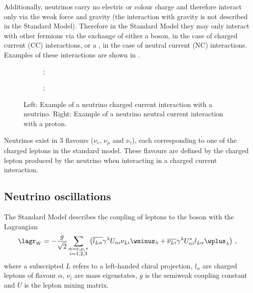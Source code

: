 Additionally, neutrinos carry no electric or colour charge and therefore interact only via the weak force and gravity (the interaction with gravity is not described in the Standard Model).
Therefore in the Standard Model they may only interact with other fermions via the exchange of either a \wpm boson, in the case of charged current (CC) interactions, or a \zboson, in the case of neutral current (NC) interactions.
Examples of these interactions are shown in .

\begin{figure}[h]
  \centering
  \begin{subfigure}[t]{.49\textwidth}
    \centering
    ;
  \end{subfigure}
  \hfill
  \begin{subfigure}[t]{.49\textwidth}
    \centering
    ;    
  \end{subfigure}
  \caption[Examples of diagrams for charged (CC) and neutral (NC) current neutrino interactions.]{Left: Example of a neutrino charged current interaction with a neutrino. Right: Example of a neutrino neutral current interaction with a proton.}
  \label{fig:nuIntEx}
\end{figure}

Neutrinos exist in 3 flavours ($\nu_{e}$, $\nu_{\mu}$ and $\nu_{\tau}$), each corresponding to one of the charged leptons in the standard model.
These flavours are defined by the charged lepton produced by the neutrino when interacting in a charged current interaction.

\subsection{Neutrino oscillations}
\label{sec:theory:theory:oscillations}


The Standard Model describes the coupling of leptons to the \wboson boson with the Lagrangian
\begin{equation}
  \lagr_{W} = - \frac{g}{\sqrt{2}} \sum_{\substack{\alpha = e, \mu, \tau \\ i = 1, 2, 3}}
  \left( \overline{l_{L\alpha}} \gamma^{\lambda} U_{\alpha i} \nu_{Li} \wminus_{\lambda} +
  \overline{\nu_{Li}} \gamma^{\lambda} U^{*}_{\alpha i} l_{L\alpha} \wplus_{\lambda} \right) \, ,
  \label{eq:lagr}
\end{equation}
where a subscripted $L$ refers to a left-handed chiral projection, $l_{\alpha}$ are charged leptons of flavour $\alpha$, $\nu_{i}$ are mass eigenstates, $g$ is the semiweak coupling constant and $U$ is the lepton mixing matrix.

